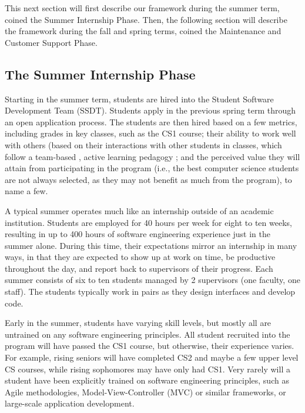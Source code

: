 This next section will first describe our framework during the summer term, coined the Summer Internship Phase. Then, the following section will describe the framework during the fall and spring terms, coined the Maintenance and Customer Support Phase.

\subsection{The Summer Internship Phase}
Starting in the summer term, students are hired into the Student Software Development Team (SSDT). Students apply in the previous spring term through an open application process. The students are then hired based on a few metrics, including grades in key classes, such as the CS1 course; their ability to work well with others (based on their interactions with other students in classes, which follow a team-based \cite{2002PairProgramming}, active learning pedagogy \cite{2012Pogil}; and the perceived value they will attain from participating in the program (i.e., the best computer science students are not always selected, as they may not benefit as much from the program), to name a few.

A typical summer operates much like an internship outside of an academic institution. Students are employed for 40 hours per week for eight to ten weeks, resulting in up to 400 hours of software engineering experience just in the summer alone. During this time, their expectations mirror an internship in many ways, in that they are expected to show up at work on time, be productive throughout the day, and report back to supervisors of their progress. Each summer consists of six to ten students managed by 2 supervisors (one faculty, one staff). The students typically work in pairs as they design interfaces and develop code.

Early in the summer, students have varying skill levels, but mostly all are untrained on any software engineering principles. All student recruited into the program will have passed the CS1 course, but otherwise, their experience varies. For example, rising seniors will have completed CS2 and maybe a few upper level CS courses, while rising sophomores may have only had CS1. Very rarely will a student have been explicitly trained on software engineering principles, such as Agile methodologies, Model-View-Controller (MVC) or similar frameworks, or large-scale application development.

